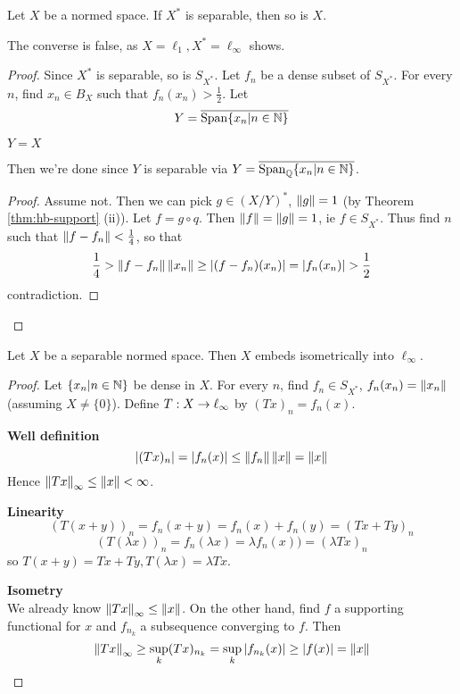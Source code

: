 \documentclass{article}
\begin{document}
\begin{nthm}
  Let $X$ be a normed space. If $X^*$ is separable, then so is $X$.
\end{nthm}
\begin{rmk}
  The converse is false, as $X = \ell_1, X^* = \ell_\infty$ shows.
\end{rmk}
\begin{proof}
  Since $X^*$ is separable, so is $S_{X^*}$. Let $f_n$ be a dense subset of $S_{X^*}$. For every $n$, find $x_n \in B_X$ such that $f_n(x_n) > \frac 12$. Let
  $$Y = \overline{\mathrm{Span}\{x_n | n \in \mathbb N\}}$$
  \begin{claim}
    $Y = X$
  \end{claim}
  Then we're done since $Y$ is separable via $Y = \overline{\mathrm{Span}_\mathbb Q\{x_n | n \in \mathbb N\}}$.
  \begin{proof}
    Assume not. Then we can pick $g \in (X/Y)^*$, $\left\lVert g\right\rVert = 1$ (by Theorem \ref{thm:hb-support} (ii)). Let $f = g \circ q$. Then $\left\lVert f\right\rVert = \left\lVert g\right\rVert = 1$, ie $f \in S_{X^*}$. Thus find $n$ such that $\left\lVert f - f_n\right\rVert < \frac 14$, so that
    $$\frac 14 > \left\lVert f - f_n\right\rVert\left\lVert x_n\right\rVert \ge \left\lvert (f - f_n)(x_n)\right\rvert = \left\lvert f_n(x_n)\right\rvert > \frac 12$$
    contradiction.
  \end{proof}
\end{proof}

\begin{nthm}
  Let $X$ be a separable normed space. Then $X$ embeds isometrically into $\ell_\infty$.
\end{nthm}
\begin{proof}
  Let $\{x_n | n \in \mathbb N\}$ be dense in $X$. For every $n$, find $f_n \in S_{X^*}$, $f_n(x_n) = \left\lVert x_n\right\rVert$ (assuming $X \ne \{0\}$). Define $T : X \rightarrow \ell_\infty$ by $(Tx)_n = f_n(x)$.

  {\bf Well definition}
  $$ \left\lvert (Tx)_n\right\rvert = \left\lvert f_n(x)\right\rvert \le \left\lVert f_n\right\rVert\left\lVert x\right\rVert = \left\lVert x\right\rVert$$
  Hence $\left\lVert Tx\right\rVert_\infty \le \left\lVert x\right\rVert < \infty$.

  {\bf Linearity}
  $$ (T(x + y))_n = f_n(x + y) = f_n(x) + f_n(y) = (Tx + Ty)_n$$
  $$ (T(\lambda x))_n = f_n(\lambda x) = \lambda f_n(x)) = (\lambda Tx)_n$$
  so $T(x + y) = Tx + Ty, T(\lambda x) = \lambda Tx$.

  {\bf Isometry} \\
  We already know $\left\lVert Tx\right\rVert_\infty \le \left\lVert x\right\rVert$. On the other hand, find $f$ a supporting functional for $x$ and $f_{n_k}$ a subsequence converging to $f$. Then
  $$\left\lVert Tx\right\rVert_\infty \ge \sup_k (Tx)_{n_k} = \sup_k \left\lvert f_{n_k}(x)\right\rvert \ge \left\lvert f(x)\right\rvert = \left\lVert x\right\rVert$$
\end{proof}
\end{document}
